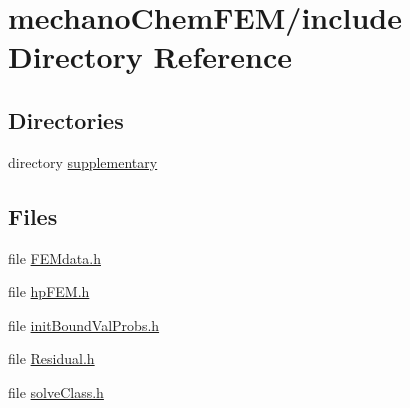 \section{mechano\-Chem\-F\-E\-M/include Directory Reference}
\label{dir_cc4ae2288fe3e6634409c16ab2b12d81}
\subsection*{Directories}
\begin{DoxyCompactItemize}
\item 
directory \hyperlink{dir_527ed3ffe4acd8953ceb1c919f167900}{supplementary}
\end{DoxyCompactItemize}
\subsection*{Files}
\begin{DoxyCompactItemize}
\item 
file \hyperlink{_f_e_mdata_8h}{F\-E\-Mdata.\-h}
\item 
file \hyperlink{hp_f_e_m_8h}{hp\-F\-E\-M.\-h}
\item 
file \hyperlink{init_bound_val_probs_8h}{init\-Bound\-Val\-Probs.\-h}
\item 
file \hyperlink{_residual_8h}{Residual.\-h}
\item 
file \hyperlink{solve_class_8h}{solve\-Class.\-h}
\end{DoxyCompactItemize}
